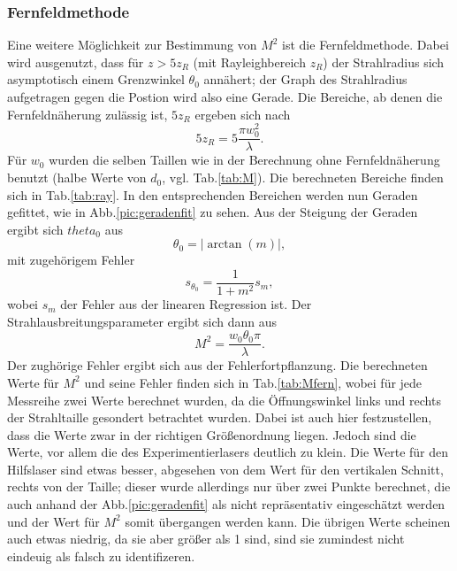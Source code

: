 \subsubsection*{Fernfeldmethode}
Eine weitere Möglichkeit zur Bestimmung von $M^2$ ist die Fernfeldmethode. Dabei wird ausgenutzt, dass für $z>5z_R$ (mit Rayleighbereich $z_R$) der Strahlradius sich asymptotisch 
einem Grenzwinkel $\theta_0$ annähert; der Graph des Strahlradius aufgetragen gegen die Postion wird also eine Gerade. 
Die Bereiche, ab denen die Fernfeldnäherung zulässig ist, $5z_R$ ergeben sich nach 
\begin{equation*}
    5z_R = 5 \frac{\pi w_0^2}{\lambda}.
\end{equation*}
Für $w_0$ wurden die selben Taillen wie in der Berechnung ohne Fernfeldnäherung benutzt (halbe Werte von $d_0$, vgl. Tab.\ref{tab:M}). Die berechneten Bereiche finden sich 
in Tab.\ref{tab:ray}. In den entsprechenden Bereichen werden nun Geraden gefittet, wie in Abb.\ref{pic:geradenfit} zu sehen. Aus der Steigung der Geraden ergibt sich $theta_0$ 
aus 
\begin{equation*}
    \theta_0 = |\arctan(m)|,
\end{equation*}
mit zugehörigem Fehler
\begin{equation*}
    s_{\theta_0} = \frac{1}{1+m^2}s_m,
\end{equation*}
wobei $s_m$ der Fehler aus der linearen Regression ist.
Der Strahlausbreitungsparameter ergibt sich dann aus
\begin{equation*}
    M^2 = \frac{w_0\theta_0 \pi }{\lambda}.
\end{equation*}
Der zughörige Fehler ergibt sich aus der Fehlerfortpflanzung. Die berechneten Werte für $M^2$ und seine Fehler finden sich in Tab.\ref{tab:Mfern}, wobei für jede Messreihe 
zwei Werte berechnet wurden, da die Öffnungswinkel links und rechts der Strahltaille gesondert betrachtet wurden. %
Dabei ist auch hier festzustellen, dass die Werte zwar in der richtigen Größenordnung liegen. Jedoch sind die Werte, vor allem die des Experimentierlasers deutlich zu klein. 
Die Werte für den Hilfslaser sind etwas besser, abgesehen von dem Wert für den vertikalen Schnitt, rechts von der Taille; dieser wurde allerdings nur über zwei Punkte berechnet, 
die auch anhand der Abb.\ref{pic:geradenfit} als nicht repräsentativ eingeschätzt werden und der Wert für $M^2$ somit übergangen werden kann. Die übrigen Werte scheinen auch 
etwas niedrig, da sie aber größer als 1 sind, sind sie zumindest nicht eindeuig als falsch zu identifizeren. 

